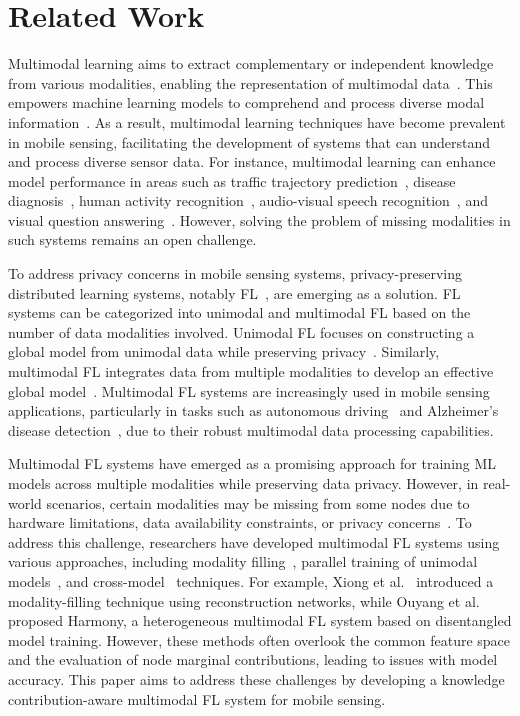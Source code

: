 \section{Related Work}
Multimodal learning aims to extract complementary or independent knowledge from various modalities, enabling the representation of multimodal data~\cite{zhang2020multi,liu2020recent}. This empowers machine learning models to comprehend and process diverse modal information~\cite{xia2021multi}. As a result, multimodal learning techniques have become prevalent in mobile sensing, facilitating the development of systems that can understand and process diverse sensor data. For instance, multimodal learning can enhance model performance in areas such as traffic trajectory prediction~\cite{shi2023lhmm}, disease diagnosis~\cite{ouyang2023harmony}, human activity recognition~\cite{chen2022mm}, audio-visual speech recognition~\cite{mroueh2015deep}, and visual question answering~\cite{lu2018r}. However, solving the problem of missing modalities in such systems remains an open challenge.



 To address privacy concerns in mobile sensing systems, privacy-preserving distributed learning systems, notably FL~\cite{zheng2023autofed,mcmahan2017communication,ouyang2023harmony}, are emerging as a solution. FL systems can be categorized into unimodal and multimodal FL based on the number of data modalities involved. Unimodal FL focuses on constructing a global model from unimodal data while preserving privacy~\cite{park2023attfl}. Similarly, multimodal FL integrates data from multiple modalities to develop an effective global model~\cite{feng2023fedmultimodal}. Multimodal FL systems are increasingly used in mobile sensing applications, particularly in tasks such as autonomous driving~\cite{zheng2023autofed} and Alzheimer's disease detection~\cite{ouyang2023harmony}, due to their robust multimodal data processing capabilities.


 Multimodal FL systems have emerged as a promising approach for training ML models across multiple modalities while preserving data privacy. However, in real-world scenarios, certain modalities may be missing from some nodes due to hardware limitations, data availability constraints, or privacy concerns~\cite{ouyang2023harmony,le2024cross,yang2024cross}. To address this challenge, researchers have developed multimodal FL systems using various approaches, including modality filling~\cite{xiong2023client}, parallel training of unimodal models~\cite{ouyang2023harmony}, and cross-model~\cite{yang2024cross} techniques. For example, Xiong et al.~\cite{xiong2023client} introduced a modality-filling technique using reconstruction networks, while Ouyang et al.~\cite{ouyang2023harmony} proposed Harmony, a heterogeneous multimodal FL system based on disentangled model training. However, these methods often overlook the common feature space and the evaluation of node marginal contributions, leading to issues with model accuracy. This paper aims to address these challenges by developing a knowledge contribution-aware multimodal FL system for mobile sensing.